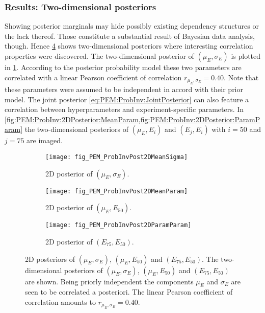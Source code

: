 \subsubsection{Results: Two-dimensional posteriors}
Showing posterior marginals may hide possibly existing dependency structures or the lack thereof.
Those constitute a substantial result of Bayesian data analysis, though.
Hence \cref{fig:PEM:ProbInv:2DPosterior} shows two-dimensional posteriors where interesting correlation properties were discovered.
The two-dimensional posterior of \((\mu_E,\sigma_E)\) is plotted in \cref{fig:PEM:ProbInv:2DPosterior:MeanSigma}.
According to the posterior probability model these two parameters are correlated with a linear Pearson coefficient of correlation \(r_{\mu_E,\sigma_E}=0.40\).
Note that these parameters were assumed to be independent in accord with their prior model.
The joint posterior \cref{eq:PEM:ProbInv:JointPosterior} can also feature a correlation between hyperparameters and experiment-specific parameters.
In \cref{fig:PEM:ProbInv:2DPosterior:MeanParam,fig:PEM:ProbInv:2DPosterior:ParamParam} the two-dimensional posteriors of \((\mu_E,E_i)\) and \((E_{j},E_{i})\) with \(i=50\) and \(j=75\) are imaged.
\begin{figure}[ht]
  \centering
  \begin{subfigure}[b]{0.33\textwidth}
    \centering
    \texttt{[image: fig\_PEM\_ProbInvPost2DMeanSigma]}
    \caption{2D posterior of \((\mu_E,\sigma_E)\).}
    \label{fig:PEM:ProbInv:2DPosterior:MeanSigma}
  \end{subfigure}%
  \begin{subfigure}[b]{0.33\textwidth}
    \centering
    \texttt{[image: fig\_PEM\_ProbInvPost2DMeanParam]}
    \caption{2D posterior of \((\mu_E,E_{50})\).}
    \label{fig:PEM:ProbInv:2DPosterior:MeanParam}
  \end{subfigure}%
  \begin{subfigure}[b]{0.33\textwidth}
    \centering
    \texttt{[image: fig\_PEM\_ProbInvPost2DParamParam]}
    \caption{2D posterior of \((E_{75},E_{50})\).}
    \label{fig:PEM:ProbInv:2DPosterior:ParamParam}
  \end{subfigure}%
  \caption[2D posteriors of \((\mu_E,\sigma_E)\), \((\mu_E,E_{50})\) and \((E_{75},E_{50})\)]{2D posteriors of \((\mu_E,\sigma_E)\), \((\mu_E,E_{50})\) and \((E_{75},E_{50})\).
           The two-dimensional posteriors of \((\mu_E,\sigma_E)\), \((\mu_E,E_{50})\) and \((E_{75},E_{50})\) are shown.
           Being priorly independent the components \(\mu_E\) and \(\sigma_E\) are seen to be correlated a posteriori.
           The linear Pearson coefficient of correlation amounts to \(r_{\mu_E,\sigma_E}=0.40\).
           }
  \label{fig:PEM:ProbInv:2DPosterior}
\end{figure}